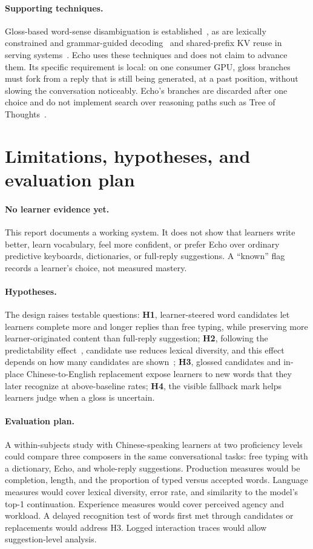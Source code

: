\documentclass[11pt,a4paper]{article}
\begin{document}
\paragraph{Supporting techniques.} Gloss-based word-sense disambiguation is established~\cite{glossbert}, as are lexically constrained and grammar-guided decoding~\cite{hokamp,outlines} and shared-prefix KV reuse in serving systems~\cite{vllm,sglang,hydragen}. Echo uses these techniques and does not claim to advance them. Its specific requirement is local: on one consumer GPU, gloss branches must fork from a reply that is still being generated, at a past position, without slowing the conversation noticeably. Echo's branches are discarded after one choice and do not implement search over reasoning paths such as Tree of Thoughts~\cite{tot}.

\section{Limitations, hypotheses, and evaluation plan}
\label{sec:limitations}
\paragraph{No learner evidence yet.} This report documents a working system. It does not show that learners write better, learn vocabulary, feel more confident, or prefer Echo over ordinary predictive keyboards, dictionaries, or full-reply suggestions. A ``known'' flag records a learner's choice, not measured mastery.

\paragraph{Hypotheses.} The design raises testable questions:
\textbf{H1}, learner-steered word candidates let learners complete more and longer replies than free typing, while preserving more learner-originated content than full-reply suggestion;
\textbf{H2}, following the predictability effect~\cite{predictable}, candidate use reduces lexical diversity, and this effect depends on how many candidates are shown~\cite{parallel};
\textbf{H3}, glossed candidates and in-place Chinese-to-English replacement expose learners to new words that they later recognize at above-baseline rates;
\textbf{H4}, the visible fallback mark helps learners judge when a gloss is uncertain.

\paragraph{Evaluation plan.} A within-subjects study with Chinese-speaking learners at two proficiency levels could compare three composers in the same conversational tasks: free typing with a dictionary, Echo, and whole-reply suggestions. Production measures would be completion, length, and the proportion of typed versus accepted words. Language measures would cover lexical diversity, error rate, and similarity to the model's top-1 continuation. Experience measures would cover perceived agency and workload. A delayed recognition test of words first met through candidates or replacements would address H3. Logged interaction traces would allow suggestion-level analysis.
\end{document}

